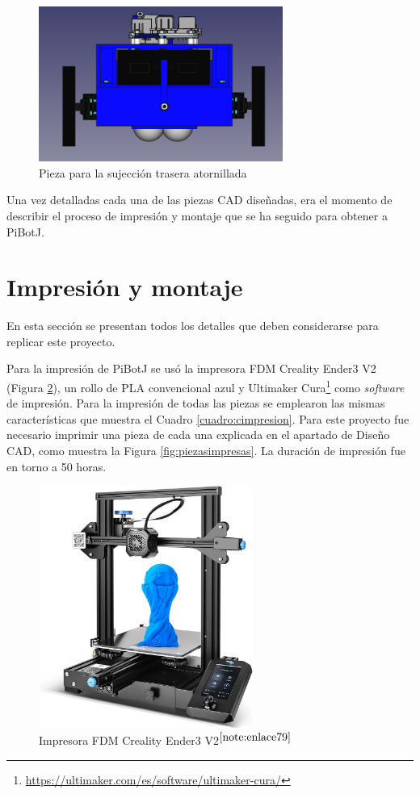 \begin{figure} [h!]
	\begin{center}
		\includegraphics[width=8cm]{figs/cap5/traseracon.png}
	\end{center}
	\caption{Pieza para la sujección trasera atornillada} 
	\label{fig:traseracon}
\end{figure}

Una vez detalladas cada una de las piezas \acs{CAD} diseñadas, era el momento de describir el proceso de impresión y montaje que se ha seguido para obtener a PiBotJ.
  
\section{Impresión y montaje}

En esta sección se presentan todos los detalles que deben considerarse para replicar este proyecto. 

Para la impresión de PiBotJ se usó la impresora FDM Creality Ender3 V2 (Figura \ref{fig:impresora}), un rollo de PLA convencional azul y Ultimaker Cura\footnote{\url{https://ultimaker.com/es/software/ultimaker-cura/}} como \textit{software} de impresión. Para la impresión de todas las piezas se emplearon las mismas características que muestra el Cuadro \ref{cuadro:cimpresion}. Para este proyecto fue necesario imprimir una pieza de cada una explicada en el apartado de Diseño CAD, como muestra la Figura \ref{fig:piezasimpresas}. La duración de impresión fue en torno a 50 horas.
 
\begin{figure} [h!]
	\begin{center}
		\includegraphics[width=7cm]{figs/cap5/impresora.jpg}
	\end{center}
	\caption{Impresora FDM Creality Ender3 V2$^{\ref{note:enlace79}}$} 
	\label{fig:impresora}
\end{figure}

